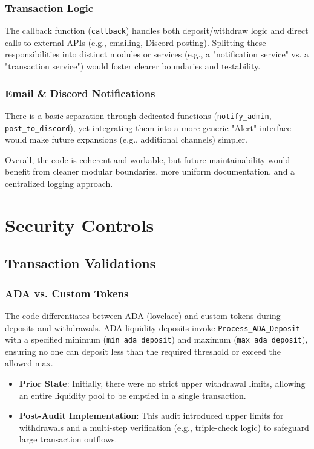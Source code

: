 \documentclass[11pt,a4paper]{report}
\begin{document}
\subsection{Transaction Logic}
The callback function (\texttt{callback}) handles both deposit/withdraw logic and direct calls to external APIs (e.g., emailing, Discord posting). Splitting these responsibilities into distinct modules or services (e.g., a "notification service" vs. a "transaction service") would foster clearer boundaries and testability.

\subsection{Email \& Discord Notifications}
There is a basic separation through dedicated functions (\texttt{notify\_admin}, \texttt{post\_to\_discord}), yet integrating them into a more generic "Alert" interface would make future expansions (e.g., additional channels) simpler.

Overall, the code is coherent and workable, but future maintainability would benefit from cleaner modular boundaries, more uniform documentation, and a centralized logging approach.

\chapter{Security Controls}

\section{Transaction Validations}

\subsection{ADA vs. Custom Tokens}
The code differentiates between ADA (lovelace) and custom tokens during deposits and withdrawals. ADA liquidity deposits invoke \texttt{Process\_ADA\_Deposit} with a specified minimum (\texttt{min\_ada\_deposit}) and maximum (\texttt{max\_ada\_deposit}), ensuring no one can deposit less than the required threshold or exceed the allowed max.

\begin{itemize}
    \item \textbf{Prior State}: Initially, there were no strict upper withdrawal limits, allowing an entire liquidity pool to be emptied in a single transaction.
    \item \textbf{Post-Audit Implementation}: This audit introduced upper limits for withdrawals and a multi-step verification (e.g., triple-check logic) to safeguard large transaction outflows.
\end{itemize}
\end{document}
